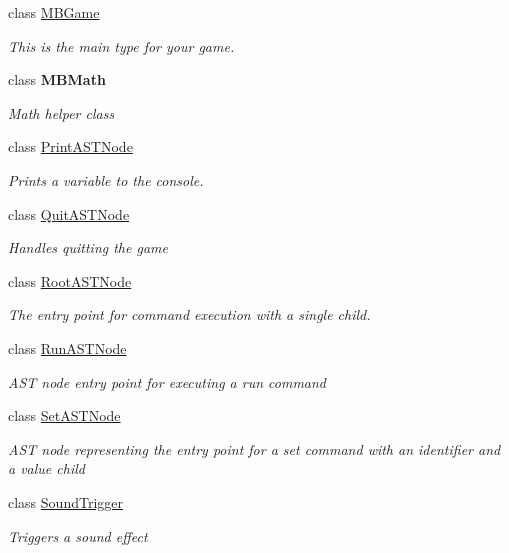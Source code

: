 \begin{DoxyCompactItemize}
class \hyperlink{class_m_b2_d_1_1_m_b_game}{M\+B\+Game}
\begin{DoxyCompactList}\small\item\em This is the main type for your game. \end{DoxyCompactList}\item 
class {\bfseries M\+B\+Math}
\begin{DoxyCompactList}\small\item\em Math helper class \end{DoxyCompactList}\item 
class \hyperlink{class_m_b2_d_1_1_print_a_s_t_node}{Print\+A\+S\+T\+Node}
\begin{DoxyCompactList}\small\item\em Prints a variable to the console. \end{DoxyCompactList}\item 
class \hyperlink{class_m_b2_d_1_1_quit_a_s_t_node}{Quit\+A\+S\+T\+Node}
\begin{DoxyCompactList}\small\item\em Handles quitting the game \end{DoxyCompactList}\item 
class \hyperlink{class_m_b2_d_1_1_root_a_s_t_node}{Root\+A\+S\+T\+Node}
\begin{DoxyCompactList}\small\item\em The entry point for command execution with a single child. \end{DoxyCompactList}\item 
class \hyperlink{class_m_b2_d_1_1_run_a_s_t_node}{Run\+A\+S\+T\+Node}
\begin{DoxyCompactList}\small\item\em A\+ST node entry point for executing a run command \end{DoxyCompactList}\item 
class \hyperlink{class_m_b2_d_1_1_set_a_s_t_node}{Set\+A\+S\+T\+Node}
\begin{DoxyCompactList}\small\item\em A\+ST node representing the entry point for a \textquotesingle{}set\textquotesingle{} command with an identifier and a value child \end{DoxyCompactList}\item 
class \hyperlink{class_m_b2_d_1_1_sound_trigger}{Sound\+Trigger}
\begin{DoxyCompactList}\small\item\em Triggers a sound effect \end{DoxyCompactList}\item 

\end{DoxyCompactItemize}
